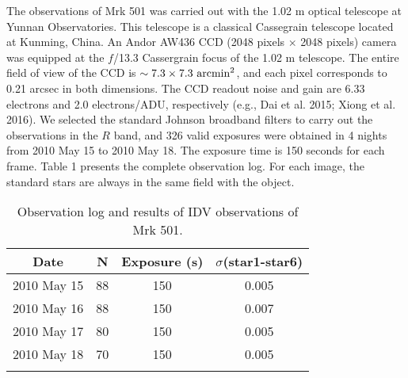 \documentclass[structabstract]{raa}
\begin{document}
   The observations of Mrk 501 was carried out with the 1.02 m optical telescope at Yunnan Observatories. This telescope
   is a classical Cassegrain telescope located at Kunming, China. An Andor AW436 CCD (2048 pixels $\times$ 2048 pixels)
   camera was equipped at the $f$/13.3 Cassergrain focus of the 1.02 m telescope. The entire field of view of the CCD is
   $\sim 7.3 \times 7.3 \/\ \rm{arcmin}^2$, and each pixel corresponds to 0.21 arcsec in both dimensions. The CCD readout
   noise and gain are 6.33 electrons and 2.0 electrons/ADU, respectively (e.g., Dai et al. 2015; Xiong et al. 2016). We selected
   the standard Johnson broadband filters to carry out the observations in the $R$ band, and 326 valid exposures were
   obtained in 4 nights from 2010 May 15 to 2010 May 18. The exposure time is 150 seconds for each frame. Table 1 presents
   the complete observation log. For each image, the standard stars are always in the same field with the object.
\begin{table}
\begin{center}
\caption[]{Observation log and results of IDV observations of Mrk 501.}
\label{Table1}
 \begin{tabular}{cccc}
  \hline\noalign{\smallskip}
   Date & N & Exposure (s) & $\sigma$(star1-star6)   \\
  \hline\noalign{\smallskip}
   2010 May 15	&	88  &  150	&	0.005		\\
   2010 May 16	&	88	&  150  &	0.007		\\
   2010 May 17	&	80	&  150  &	0.005		\\
   2010 May 18	&	70	&  150  &	0.005		\\
  \noalign{\smallskip}\hline
\end{tabular}
\end{center}
\end{table}
\end{document}

